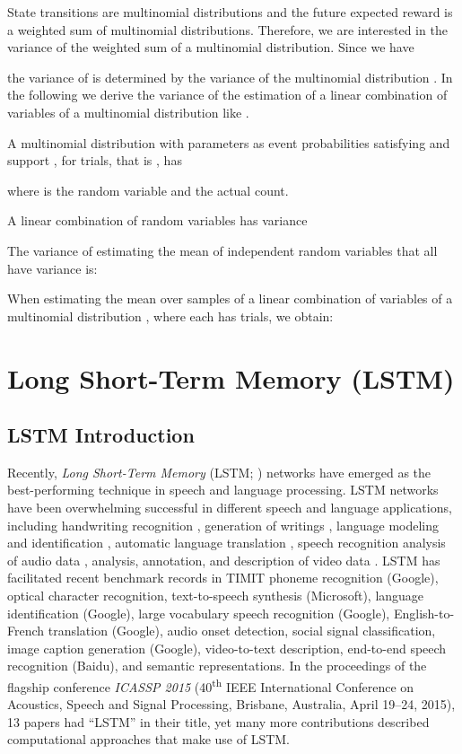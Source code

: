 \documentclass{article}
\begin{document}
\begin{appendices}
State transitions are multinomial distributions and the future
expected reward is a weighted sum of multinomial distributions.
Therefore, we are interested in the variance of the weighted sum
of a multinomial distribution.
Since we have

the variance of 
is determined by the variance of the multinomial distribution
. In the following we derive
the variance of the estimation of a
linear combination of variables of a multinomial distribution like
.


A multinomial distribution with parameters  as
event probabilities satisfying 
and support ,  for 
trials, that is , has

where  is the random variable and  the actual count.

A linear combination of random variables has variance



The variance of estimating the mean  of independent random variables
 that all have variance  is:



When estimating the mean  over  samples
of a linear combination of variables of a
multinomial distribution , where each  has
 trials, we obtain:


\section{Long Short-Term Memory (LSTM)}

\subsection{LSTM Introduction}


Recently, {\em Long Short-Term Memory} (LSTM; \cite{Hochreiter:91,Hochreiter:95,Hochreiter:97})
networks have emerged as the best-performing technique in speech and language processing.
LSTM networks have been overwhelming successful in different speech and language applications,
including handwriting recognition \cite{Graves:09}, generation of writings
\cite{Graves:13}, language modeling and identification \cite{Gonzalez-Dominguez:14,Zaremba:14arxiva},
automatic language translation \cite{Sutskever:14nips}, 
speech recognition \cite{Sak:14,Geiger:14}
analysis of audio data \cite{Marchi:14}, analysis, annotation, and
description of video data \cite{Donahue:14,Venugopalan:14,Srivastava:15}. 
LSTM has facilitated recent benchmark records in TIMIT phoneme recognition (Google),
optical character recognition, text-to-speech synthesis (Microsoft),
language identification (Google), large vocabulary speech recognition (Google),
English-to-French translation (Google), audio onset detection, social signal classification,
image caption generation (Google), video-to-text description, end-to-end speech recognition (Baidu),
and semantic representations. In the proceedings of the flagship conference {\em ICASSP 2015}
(40\textsuperscript{th} IEEE International Conference on Acoustics, Speech and Signal
Processing, Brisbane, Australia, April 19--24, 2015), 13 papers had ``LSTM'' in their
title, yet many more contributions described computational approaches that make use of LSTM.


\end{appendices}
\end{document}
